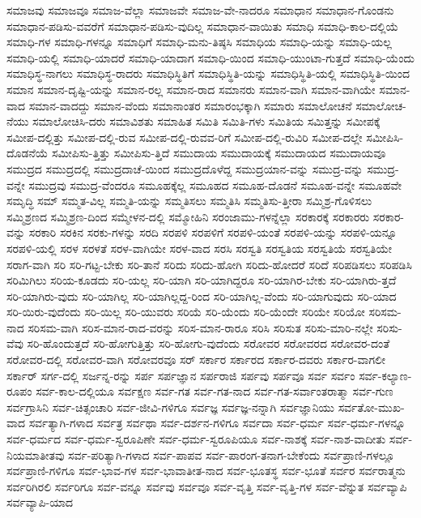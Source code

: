{ಸಮಾಜವು
ಸಮಾಜವೂ
ಸಮಾಜ-ವೆಲ್ಲಾ
ಸಮಾಜವೇ
ಸಮಾಜ-ವೇ-ನಾದರೂ
ಸಮಾಧಾನ
ಸಮಾಧಾನ-ಗೊಂಡನು
ಸಮಾಧಾನ-ಪಡಿಸು-ವವರೆಗೆ
ಸಮಾಧಾನ-ಪಡಿಸು-ವುದಿಲ್ಲ
ಸಮಾಧಾನ-ವಾಯಿತು
ಸಮಾಧಿ
ಸಮಾಧಿ-ಕಾಲ-ದಲ್ಲಿಯೆ
ಸಮಾಧಿ-ಗಳ
ಸಮಾಧಿ-ಗಳನ್ನೂ
ಸಮಾಧಿಗೆ
ಸಮಾಧಿ-ಮನು-ತಿಷ್ಠಸಿ
ಸಮಾಧಿಯ
ಸಮಾಧಿ-ಯನ್ನು
ಸಮಾಧಿ-ಯಲ್ಲ
ಸಮಾಧಿ-ಯಲ್ಲಿ
ಸಮಾಧಿ-ಯಾದರೆ
ಸಮಾಧಿ-ಯಾದಾಗ
ಸಮಾಧಿ-ಯಿಂದ
ಸಮಾಧಿ-ಯುಂಟಾ-ಗುತ್ತದೆ
ಸಮಾಧಿ-ಯೆಂದು
ಸಮಾಧಿಸ್ಥ-ನಾಗಲು
ಸಮಾಧಿಸ್ಥ-ರಾದರು
ಸಮಾಧಿಸ್ಥಿತಿಗೆ
ಸಮಾಧಿಸ್ಥಿತಿ-ಯನ್ನು
ಸಮಾಧಿಸ್ಥಿತಿ-ಯಲ್ಲಿ
ಸಮಾಧಿಸ್ಥಿತಿ-ಯಿಂದ
ಸಮಾನ
ಸಮಾನ-ದೃಷ್ಟಿ-ಯನ್ನು
ಸಮಾನ-ರಲ್ಲ
ಸಮಾನ-ರಾದ
ಸಮಾನರು
ಸಮಾನ-ವಾಗಿ
ಸಮಾನ-ವಾಗಿಯೇ
ಸಮಾನ-ವಾದ
ಸಮಾನ-ವಾದದ್ದು
ಸಮಾನ-ವೆಂದು
ಸಮಾನಾಂತರ
ಸಮಾರಂಭಕ್ಕಾಗಿ
ಸಮಾರು
ಸಮಾಲೋಚನೆ
ಸಮಾಲೋಚ-ನೆಯು
ಸಮಾಲೋಚಿಸಿ-ದರು
ಸಮಾವಿಶತು
ಸಮಾಹಿತ
ಸಮಿತಿ
ಸಮಿತಿ-ಗಳು
ಸಮಿತಿಯ
ಸಮಿತ್ತನ್ನು
ಸಮೀಪಕ್ಕೆ
ಸಮೀಪ-ದಲ್ಲಿತ್ತು
ಸಮೀಪ-ದಲ್ಲಿ-ರುವ
ಸಮೀಪ-ದಲ್ಲಿ-ರುವವ-ರಿಗೆ
ಸಮೀಪ-ದಲ್ಲಿ-ರುವಿರಿ
ಸಮೀಪ-ದಲ್ಲೇ
ಸಮೀಪಿಸಿ-ದೊಡನೆಯೆ
ಸಮೀಪಿಸು-ತ್ತಿತ್ತು
ಸಮೀಪಿಸು-ತ್ತಿದೆ
ಸಮುದಾಯ
ಸಮುದಾಯಕ್ಕೆ
ಸಮುದಾಯದ
ಸಮುದಾಯವೂ
ಸಮುದ್ರದ
ಸಮುದ್ರದಲ್ಲಿ
ಸಮುದ್ರದಾಚೆ-ಯಿಂದ
ಸಮುದ್ರದೊಳೆದ್ದ
ಸಮುದ್ರಯಾನ-ವನ್ನು
ಸಮುದ್ರ-ವನ್ನು
ಸಮುದ್ರ-ವನ್ನೇ
ಸಮುದ್ರವು
ಸಮುದ್ರ-ವೆಂದರೂ
ಸಮೂಹಕ್ಕೆಲ್ಲ
ಸಮೂಹದ
ಸಮೂಹ-ದೊಡನೆ
ಸಮೂಹ-ವನ್ನೇ
ಸಮೂಹವೇ
ಸಮೃದ್ಧಿ
ಸಮ್
ಸಮ್ಮತ-ವಿಲ್ಲ
ಸಮ್ಮತಿ-ಯನ್ನು
ಸಮ್ಮತಿಸಲು
ಸಮ್ಮತಿಸಿ
ಸಮ್ಮತಿಸು-ತ್ತೀರಾ
ಸಮ್ಮಿಶ್ರ-ಗೊಳಿಸಲು
ಸಮ್ಮಿಶ್ರಣದ
ಸಮ್ಮಿಶ್ರಣ-ದಿಂದ
ಸಮ್ಮೇಳನ-ದಲ್ಲಿ
ಸಮ್ಮೋಹಿನಿ
ಸರಂಜಾಮು-ಗಳನ್ನೆಲ್ಲಾ
ಸರಕಾರಕ್ಕೆ
ಸರಕಾರರು
ಸರಕಾರ-ವನ್ನು
ಸರಕಾರಿ
ಸರಕಿನ
ಸರಕು-ಗಳನ್ನು
ಸರದಿ
ಸರಪಳಿ
ಸರಪಳಿಗೆ
ಸರಪಳಿ-ಯಂತೆ
ಸರಪಳಿ-ಯನ್ನು
ಸರಪಳಿ-ಯನ್ನೂ
ಸರಪಳಿ-ಯಲ್ಲಿ
ಸರಳ
ಸರಳತೆ
ಸರಳ-ವಾಗಿಯೇ
ಸರಳ-ವಾದ
ಸರಸಿ
ಸರಸ್ವತಿ
ಸರಸ್ವತಿಯ
ಸರಸ್ವತಿಯೆ
ಸರಸ್ವತಿಯೇ
ಸರಾಗ-ವಾಗಿ
ಸರಿ
ಸರಿ-ಗಟ್ಟ-ಬೇಕು
ಸರಿ-ತಾನೆ
ಸರಿದು
ಸರಿದು-ಹೋಗಿ
ಸರಿದು-ಹೋದರೆ
ಸರಿದೆ
ಸರಿಪಡಿಸಲು
ಸರಿಪಡಿಸಿ
ಸರಿಮಿಗಿಲು
ಸರಿಯ-ಕೂಡದು
ಸರಿ-ಯಲ್ಲ
ಸರಿ-ಯಾಗಿ
ಸರಿ-ಯಾಗಿದ್ದರೂ
ಸರಿ-ಯಾಗಿರ-ಬೇಕು
ಸರಿ-ಯಾಗಿರು-ತ್ತದೆ
ಸರಿ-ಯಾಗಿರು-ವುದು
ಸರಿ-ಯಾಗಿಲ್ಲ
ಸರಿ-ಯಾಗಿಲ್ಲದ್ದ-ರಿಂದ
ಸರಿ-ಯಾಗಿಲ್ಲ-ವೆಂದು
ಸರಿ-ಯಾಗುವುದು
ಸರಿ-ಯಾದ
ಸರಿ-ಯಿರು-ವುದೆಂದು
ಸರಿ-ಯಿಲ್ಲ
ಸರಿ-ಯುವರು
ಸರಿಯೆ
ಸರಿ-ಯೆಂದು
ಸರಿ-ಯೆಂದೇ
ಸರಿಯೇ
ಸರಿಯೋ
ಸರಿಸಮ-ನಾದ
ಸರಿಸಮ-ವಾಗಿ
ಸರಿಸ-ಮಾನ-ರಾದ-ವರನ್ನು
ಸರಿಸ-ಮಾನ-ರಾರೂ
ಸರಿಸಿ
ಸರಿಸುತ
ಸರಿಸು-ಮಾರಿ-ನಲ್ಲೇ
ಸರಿಸು-ವೆವು
ಸರಿ-ಹೊಂದುತ್ತದೆ
ಸರಿ-ಹೋಗುತ್ತಿತ್ತು
ಸರಿ-ಹೋಗು-ವುದೆಂದು
ಸರೋವರ
ಸರೋವರದ
ಸರೋವರ-ದಂತೆ
ಸರೋವರ-ದಲ್ಲಿ
ಸರೋವರ-ವಾಗಿ
ಸರೋವರವೂ
ಸರ್
ಸರ್ಕಾರ
ಸರ್ಕಾರದ
ಸರ್ಕಾರ-ದವರು
ಸರ್ಕಾರ-ವಾಗಲೀ
ಸರ್ಕಾರ್
ಸರ್ಗ-ದಲ್ಲಿ
ಸರ್ಜನ್ನ-ರನ್ನು
ಸರ್ಪ
ಸರ್ಪಜ್ಞಾನ
ಸರ್ಪರಾಜಿ
ಸರ್ಪವು
ಸರ್ಪವೂ
ಸರ್ವ
ಸರ್ವಂ
ಸರ್ವ-ಕಲ್ಯಾಣ-ರೂಪಂ
ಸರ್ವ-ಕಾಲ-ದಲ್ಲಿಯೂ
ಸರ್ವಕ್ಷಣ
ಸರ್ವ-ಗತ
ಸರ್ವ-ಗತ-ನಾದ
ಸರ್ವ-ಗತ-ಸರ್ವಾಂತರಾತ್ಮಾ
ಸರ್ವ-ಗುಣ
ಸರ್ವಗ್ರಾಸಿನಿ
ಸರ್ವ-ಚಿತ್ಸಂಚಾರಿ
ಸರ್ವ-ಜೀವಿ-ಗಳಿಗೂ
ಸರ್ವಜ್ಞ
ಸರ್ವಜ್ಞ-ನನ್ನಾಗಿ
ಸರ್ವಜ್ಞಾನಿಯು
ಸರ್ವತೋ-ಮುಖ-ವಾದ
ಸರ್ವತ್ಯಾಗಿ-ಗಳಾದ
ಸರ್ವತ್ರ
ಸರ್ವಥಾ
ಸರ್ವ-ದರ್ಶನ-ಗಳಿಗೂ
ಸರ್ವದಾ
ಸರ್ವ-ಧರ್ಮ
ಸರ್ವ-ಧರ್ಮ-ಗಳನ್ನೂ
ಸರ್ವ-ಧರ್ಮದ
ಸರ್ವ-ಧರ್ಮ-ಸ್ವರೂಪಿಣೇ
ಸರ್ವ-ಧರ್ಮ-ಸ್ವರೂಪಿಯೂ
ಸರ್ವ-ನಾಶಕ್ಕೆ
ಸರ್ವ-ನಾಶ-ವಾದೀತು
ಸರ್ವ-ನಿಯಮಾತೀತವು
ಸರ್ವ-ಪರಿತ್ಯಾಗಿ-ಗಳಾದ
ಸರ್ವ-ಪಾಪವ
ಸರ್ವ-ಪಾರಂಗ-ತನಾಗ-ಬೇಕೆಂದು
ಸರ್ವಪ್ರಾಣಿ-ಗಳಲ್ಲೂ
ಸರ್ವಪ್ರಾಣಿ-ಗಳಿಗೂ
ಸರ್ವ-ಭಾವ-ಗಳ
ಸರ್ವ-ಭಾವಾತೀತ-ನಾದ
ಸರ್ವ-ಭೂತಸ್ಥ
ಸರ್ವ-ಭೂತೆ
ಸರ್ವರ
ಸರ್ವರಾತ್ಮನು
ಸರ್ವರಿಗಿರಲಿ
ಸರ್ವರಿಗೂ
ಸರ್ವ-ವನ್ನೂ
ಸರ್ವವು
ಸರ್ವವೂ
ಸರ್ವ-ವೃತ್ತಿ
ಸರ್ವ-ವೃತ್ತಿ-ಗಳ
ಸರ್ವ-ವೆನ್ನುತ
ಸರ್ವವ್ಯಾಪಿ
ಸರ್ವವ್ಯಾಪಿ-ಯಾದ
}
